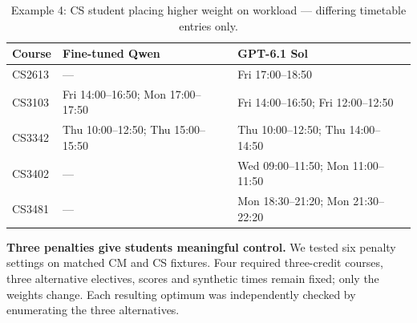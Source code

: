 \documentclass{article}
\begin{document}
\begin{table}[H]
\centering\small
\caption{Example 4: CS student placing higher weight on workload --- differing timetable entries only.}
\begin{tabular}{p{.6in}p{2.2in}p{2.2in}}
\toprule
Course & Fine-tuned Qwen & GPT-6.1 Sol\\
\midrule
{\raggedright CS2613\par} & {\raggedright ---\par} & {\raggedright Fri 17:00--18:50\par}\\
{\raggedright CS3103\par} & {\raggedright Fri 14:00--16:50; Mon 17:00--17:50\par} & {\raggedright Fri 14:00--16:50; Fri 12:00--12:50\par}\\
{\raggedright CS3342\par} & {\raggedright Thu 10:00--12:50; Thu 15:00--15:50\par} & {\raggedright Thu 10:00--12:50; Thu 14:00--14:50\par}\\
{\raggedright CS3402\par} & {\raggedright ---\par} & {\raggedright Wed 09:00--11:50; Mon 11:00--11:50\par}\\
{\raggedright CS3481\par} & {\raggedright ---\par} & {\raggedright Mon 18:30--21:20; Mon 21:30--22:20\par}\\
\bottomrule
\end{tabular}
\label{tab:comparison04-4}
\end{table}

\textbf{Three penalties give students meaningful control.} We tested six penalty settings on matched CM and CS fixtures. Four required three-credit courses, three alternative electives, scores and synthetic times remain fixed; only the weights change. Each resulting optimum was independently checked by enumerating the three alternatives.
\end{document}

